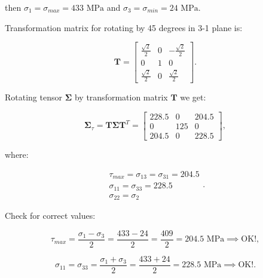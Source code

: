 \documentclass[10pt,b5paper,titlepage]{book}
\begin{document}
\begin{itemize}
        then $\sigma_1 = \sigma_{max} = 433 \text{ MPa}$ and
        $\sigma_3 = \sigma_{min} = 24 \text{ MPa}$.

        Transformation matrix for rotating by 45 degrees in 3-1 plane is:

        \begin{equation}
            \mathbf{T} = \begin{bmatrix}
                \frac{\sqrt{2}}{2} & 0 & -\frac{\sqrt{2}}{2} \\
                0 & 1 & 0 \\
                \frac{\sqrt{2}}{2} & 0 & \frac{\sqrt{2}}{2}
            \end{bmatrix}
        .\end{equation}

        Rotating tensor $\mathbf{\Sigma}$ by transformation matrix $\mathbf{T}$ we get:

        \begin{equation}
            \mathbf{\Sigma}_{\tau} = \mathbf{T}\mathbf{\Sigma}\mathbf{T}^{T}
            = \begin{bmatrix}
                228.5 & 0 & 204.5 \\
                0 & 125 & 0 \\
                204.5 & 0 & 228.5
            \end{bmatrix}
        ,\end{equation}

        where:

        \begin{equation}
            \begin{array}{l}
                \tau_{max} = \sigma_{13} = \sigma_{31} = 204.5 \\
                \sigma_{11} = \sigma_{33} = 228.5 \\
                \sigma_{22} = \sigma_2
            \end{array}
        .\end{equation}

        Check for correct values:

        \begin{equation}
            \tau_{max} = \frac{\sigma_1 - \sigma_3}{2} = \frac{433 - 24}{2}
            = \frac{409}{2} = 204.5 \text{ MPa} \implies \text{OK!}
        ,\end{equation}

        \begin{equation}
            \sigma_{11} = \sigma_{33} = \frac{\sigma_1 + \sigma_3}{2}
            = \frac{433 + 24}{2} = 228.5 \text{ MPa} \implies \text{OK!}
        .\end{equation}


\end{itemize}
\end{document}
